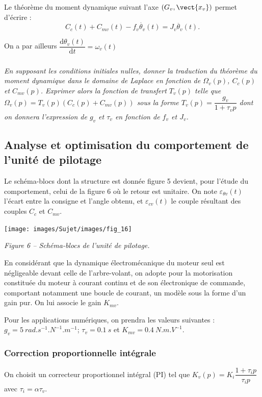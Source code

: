 \documentclass[10pt,fleqn]{article} %
\begin{document}
Le théorème du moment dynamique suivant l’axe $\left(G_v,\vect{x_v}\right)$ permet d’écrire :
$$
C_c(t)+C_{mv}(t)-f_v\dot{\theta_v}(t)=J_v\ddot{\theta_v}(t).
$$

On a par ailleurs $\dfrac{\text{d}\theta_v(t)}{\text{d} t}=\omega_v(t)$

\subparagraph{}
\textit{En supposant les conditions initiales nulles, donner la traduction du théorème du moment dynamique dans le
domaine de Laplace en fonction de $\Omega_v(p)$, $C_c(p)$ et $C_{mv}(p)$.  Exprimer alors la fonction de transfert $T_v(p)$ telle que 
$\Omega_v(p)=T_v(p)\left( C_c(p)+C_{mv}(p)\right)$ sous la forme $T_v(p)=\dfrac{g_v}{1+\tau_vp}$ dont on donnera l'expression de $g_v$ et $\tau_v$ en fonction de $f_v$ et $J_v$.}
\ifprof
\begin{corrige}
\end{corrige}
\else
\fi

\subsection{Analyse et optimisation du comportement de l'unité de pilotage}
Le schéma-blocs dont la structure est donnée figure 5 devient, pour l'étude du comportement, celui de
la figure 6 où le retour est unitaire. On note $\varepsilon_{\theta v}(t)$ l'écart entre la consigne et l'angle obtenu, et $\varepsilon_{c v}(t)$ le couple résultant des couples $C_c$ et $C_{mv}$.


\begin{center}
\texttt{[image: images/Sujet/images/fig\_16]}

\textit{Figure 6 -- Schéma-blocs de l'unité de pilotage.}
\end{center}

En considérant que la dynamique électromécanique du moteur seul est négligeable devant celle de
l'arbre-volant, on adopte pour la motorisation constituée du moteur à courant continu et de son
électronique de commande, comportant notamment une boucle de courant, un modèle sous la forme
d'un gain pur. On lui associe le gain $K_{mv}$.

Pour les applications numériques, on prendra les valeurs suivantes : 
$g_v = \SI{5}{rad.s^{-1}.N^{-1}.m^{-1}}$; $\tau_v=\SI{0,1}{s}$ et $K_{mv} = \SI{0,4}{N.m.V^{-1}}$.


\subsubsection*{Correction proportionnelle intégrale}
On choisit un correcteur proportionnel intégral (PI) tel que $K_v(p)=K_i\dfrac{1+\tau_i p}{\tau_i p}$ avec $\tau_i=\alpha \tau_v$.
\end{document}
